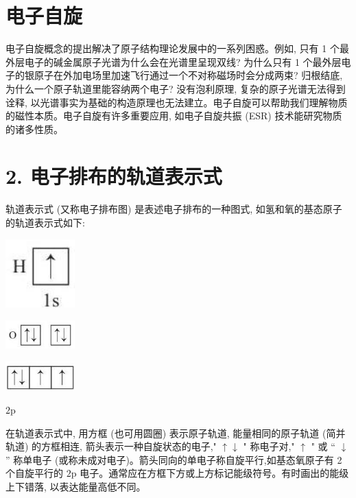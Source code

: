 \documentclass[10pt]{article}
\begin{document}
\section*{电子自旋}

电子自旋概念的提出解决了原子结构理论发展中的一系列困惑。例如, 只有 1 个最外层电子的碱金属原子光谱为什么会在光谱里呈现双线? 为什么只有 1 个最外层电子的银原子在外加电场里加速飞行通过一个不对称磁场时会分成两束? 归根结底, 为什么一个原子轨道里能容纳两个电子? 没有泡利原理, 复杂的原子光谱无法得到诠释, 以光谱事实为基础的构造原理也无法建立。电子自旋可以帮助我们理解物质的磁性本质。电子自旋有许多重要应用, 如电子自旋共振 (ESR) 技术能研究物质的诸多性质。

\section*{2. 电子排布的轨道表示式}

轨道表示式 (又称电子排布图) 是表述电子排布的一种图式, 如氢和氧的基态原子的轨道表示式如下:

\begin{center}
\includegraphics[max width=0.2\textwidth]{images/0190e026-5a11-7df7-bd27-54d09026ba7a_18_472867.jpg}
\end{center}

\begin{center}
\includegraphics[max width=0.2\textwidth]{images/0190e026-5a11-7df7-bd27-54d09026ba7a_18_238820.jpg}
\end{center}

\begin{center}
\includegraphics[max width=0.2\textwidth]{images/0190e026-5a11-7df7-bd27-54d09026ba7a_18_503436.jpg}
\end{center}

\(2\mathrm{p}\)

在轨道表示式中, 用方框 (也可用圆圈) 表示原子轨道, 能量相同的原子轨道 (简并轨道) 的方框相连, 箭头表示一种自旋状态的电子," \(\uparrow \downarrow\) " 称电子对," \(\uparrow\) " 或 “ \(\downarrow\) ” 称单电子 (或称未成对电子)。箭头同向的单电子称自旋平行,如基态氧原子有 2 个自旋平行的 \(2\mathrm{p}\) 电子。通常应在方框下方或上方标记能级符号。有时画出的能级上下错落, 以表达能量高低不同。
\end{document}
